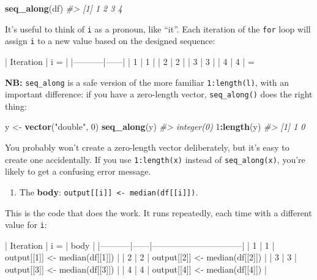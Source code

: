 \documentclass[]{book}
\newenvironment{Shaded}{\begin{snugshade}}{\end{snugshade}}
\newcommand{\KeywordTok}[1]{\textcolor[rgb]{0.13,0.29,0.53}{\textbf{#1}}}
\newcommand{\DecValTok}[1]{\textcolor[rgb]{0.00,0.00,0.81}{#1}}
\newcommand{\StringTok}[1]{\textcolor[rgb]{0.31,0.60,0.02}{#1}}
\newcommand{\CommentTok}[1]{\textcolor[rgb]{0.56,0.35,0.01}{\textit{#1}}}
\newcommand{\OperatorTok}[1]{\textcolor[rgb]{0.81,0.36,0.00}{\textbf{#1}}}
\newcommand{\NormalTok}[1]{#1}
\providecommand{\tightlist}{%
  \setlength{\itemsep}{0pt}\setlength{\parskip}{0pt}}
\begin{document}
\begin{Shaded}
\begin{Highlighting}[]
\KeywordTok{seq_along}\NormalTok{(df)}
\CommentTok{#> [1] 1 2 3 4}
\end{Highlighting}
\end{Shaded}

It's useful to think of \texttt{i} as a pronoun, like ``it''. Each
iteration of the \texttt{for} loop will assign \texttt{i} to a new value
based on the designed sequence:

\begin{Shaded}
\begin{Highlighting}[]
\NormalTok{| Iteration | i =  |}
\NormalTok{|-----------|------|}
\NormalTok{| 1         | 1    | }
\NormalTok{| 2         | 2    | }
\NormalTok{| 3         | 3    | }
\NormalTok{| 4         | 4    | }
\NormalTok{=}
\end{Highlighting}
\end{Shaded}

\textbf{NB:} \texttt{seq\_along} is a safe version of the more familiar
\texttt{1:length(l)}, with an important difference: if you have a
zero-length vector, \texttt{seq\_along()} does the right thing:

\begin{Shaded}
\begin{Highlighting}[]
\NormalTok{y <-}\StringTok{ }\KeywordTok{vector}\NormalTok{(}\StringTok{"double"}\NormalTok{, }\DecValTok{0}\NormalTok{)}
\KeywordTok{seq_along}\NormalTok{(y)}
\CommentTok{#> integer(0)}
\DecValTok{1}\OperatorTok{:}\KeywordTok{length}\NormalTok{(y)}
\CommentTok{#> [1] 1 0}
\end{Highlighting}
\end{Shaded}

You probably won't create a zero-length vector deliberately, but it's
easy to create one accidentally. If you use \texttt{1:length(x)} instead
of \texttt{seq\_along(x)}, you're likely to get a confusing error
message.

\begin{enumerate}
\def\labelenumi{\arabic{enumi}.}
\setcounter{enumi}{2}
\tightlist
\item
  The \textbf{body}:
  \texttt{output{[}{[}i{]}{]}\ \textless{}-\ median(df{[}{[}i{]}{]})}.
\end{enumerate}

This is the code that does the work. It runs repeatedly, each time with
a different value for \texttt{i}:

\begin{Shaded}
\begin{Highlighting}[]
\NormalTok{| Iteration | i =  | body                           |}
\NormalTok{|-----------|------|--------------------------------|}
\NormalTok{| 1         | 1    | output[[1]] <- median(df[[1]]) |}
\NormalTok{| 2         | 2    | output[[2]] <- median(df[[2]]) |}
\NormalTok{| 3         | 3    | output[[3]] <- median(df[[3]]) |}
\NormalTok{| 4         | 4    | output[[4]] <- median(df[[4]]) |}
\end{Highlighting}
\end{Shaded}
\end{document}
